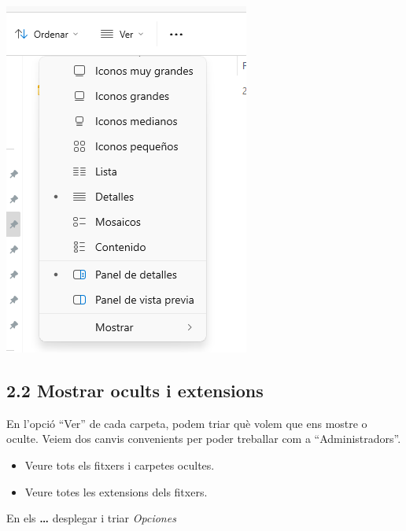 \documentclass[
  a4paper,
]{article}
\providecommand{\tightlist}{%
  \setlength{\itemsep}{0pt}\setlength{\parskip}{0pt}}
\begin{document}
\includegraphics{png/verVistaDetalle0.png}

\subsection{2.2 Mostrar ocults i
extensions}\label{mostrar-ocults-i-extensions}

En l'opció ``Ver'' de cada carpeta, podem triar què volem que ens mostre
o oculte. Veiem dos canvis convenients per poder treballar com a
``Administradors''.

\begin{itemize}
\tightlist
\item
  Veure tots els fitxers i carpetes ocultes.
\item
  Veure totes les extensions dels fitxers.
\end{itemize}

En els \textbf{\ldots{}} desplegar i triar \emph{Opciones}
\end{document}
